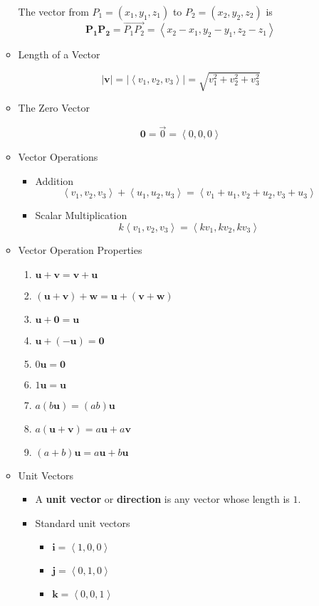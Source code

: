 \documentclass[12pt]{article}
\renewcommand{\vec}[1]{\mathbf{#1}}
\newcommand{\veci}{\mathbf{i}}
\newcommand{\vecj}{\mathbf{j}}
\newcommand{\veck}{\mathbf{k}}
\newcommand{\<}{\left<}
\renewcommand{\>}{\right>}
\begin{document}
\begin{itemize}
\begin{itemize}
  The vector from $P_1 = (x_1,y_1,z_1)$ to $P_2 = (x_2,y_2,z_2)$ is \[\vec{P_1P_2} = \overrightarrow{P_1P_2} = \<x_2-x_1,y_2-y_1,z_2-z_1\>\]
  
  \item Length of a Vector
  
    \[|\vec{v}| = |\<v_1,v_2,v_3\>| = \sqrt{v_1^2 + v_2^2 + v_3^2}\]
  
  \item The Zero Vector
  
  \[\vec{0} = \overrightarrow{0} = \<0,0,0\>\]
  
  \item Vector Operations
    \begin{itemize}
    \item Addition
      \[\<v_1,v_2,v_3\> + \<u_1,u_2,u_3\> = \<v_1+u_1,v_2+u_2,v_3+u_3\>\]
    \item Scalar Multiplication
      \[k\<v_1,v_2,v_3\> = \<kv_1,kv_2,kv_3\> \]
    \end{itemize}

  \item Vector Operation Properties
    \begin{enumerate}
    \item $\vec{u}+\vec{v} = \vec{v}+\vec{u}$
    \item $(\vec{u}+\vec{v})+\vec{w} = \vec{u}+(\vec{v}+\vec{w})$
    \item $\vec{u}+\vec{0} = \vec{u}$
    \item $\vec{u}+(-\vec{u}) = \vec{0}$
    \item $0\vec{u} = \vec{0}$
    \item $1\vec{u} = \vec{u}$
    \item $a(b\vec{u}) = (ab)\vec{u}$
    \item $a(\vec{u} + \vec{v}) = a\vec{u} + a\vec{v}$
    \item $(a+b)\vec{u} = a\vec{u} + b\vec{u}$
    \end{enumerate}

  \item Unit Vectors
    \begin{itemize}
    \item A \textbf{unit vector} or \textbf{direction} is any vector whose length is $1$.
    
    \item Standard unit vectors
      \begin{itemize}
      \item $\veci = \<1,0,0\>$
      \item $\vecj = \<0,1,0\>$
      \item $\veck = \<0,0,1\>$
      \end{itemize}


\end{itemize}
\end{itemize}
\end{itemize}
\end{document}

